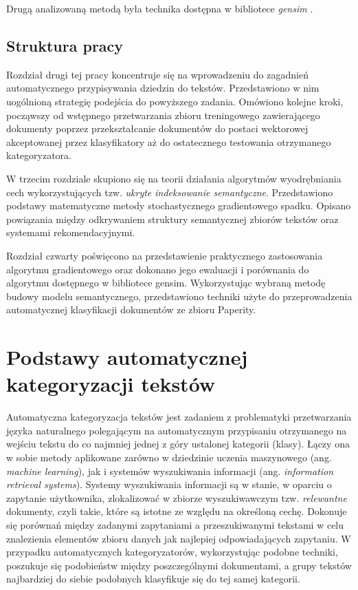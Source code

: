 \documentclass{pracamgr}
\begin{document}
Drugą analizowaną metodą była technika dostępna w bibliotece \textit{gensim} \cite{gensim}.

\section{Struktura pracy}

Rozdział drugi tej pracy koncentruje się na wprowadzeniu do zagadnień automatycznego przypisywania dziedzin do tekstów. Przedstawiono w nim uogólnioną strategię podejścia do powyższego zadania. Omówiono kolejne kroki, począwszy od wstępnego przetwarzania zbioru treningowego zawierającego dokumenty poprzez przekształcanie dokumentów do postaci wektorowej akceptowanej przez klasyfikatory aż do ostatecznego testowania otrzymanego kategoryzatora.

W trzecim rozdziale skupiono się na teorii działania algorytmów wyodrębniania cech wykorzystujących tzw. \textit{ukryte indeksowanie semantyczne}. Przedstawiono podstawy matematyczne metody stochastycznego gradientowego spadku. Opisano powiązania między odkrywaniem struktury semantycznej zbiorów tekstów oraz systemami rekomendacyjnymi.

Rozdział czwarty poświęcono na przedstawienie praktycznego zastosowania algorytmu gradientowego oraz dokonano jego ewaluacji i porównania do algorytmu dostępnego w bibliotece gensim. Wykorzystując wybraną metodę budowy modelu semantycznego, przedstawiono techniki użyte do przeprowadzenia automatycznej klasyfikacji dokumentów ze zbioru Paperity.

\chapter{Podstawy automatycznej kategoryzacji tekstów}

Automatyczna kategoryzacja tekstów jest zadaniem z problematyki przetwarzania języka naturalnego polegającym na automatycznym przypisaniu otrzymanego na wejściu tekstu do co najmniej jednej z góry ustalonej kategorii (klasy). Łączy ona w sobie metody aplikowane zarówno w dziedzinie uczenia maszynowego (ang. \textit{machine learning}), jak i systemów wyszukiwania informacji (ang. \textit{information retrieval systems}). Systemy wyszukiwania informacji są w stanie, w oparciu o zapytanie użytkownika, zlokalizować w zbiorze wyszukiwawczym tzw. \textit{relewantne} dokumenty, czyli takie, które są istotne ze względu na określoną cechę. Dokonuje się porównań między zadanymi zapytaniami a przeszukiwanymi tekstami w celu znalezienia elementów zbioru danych jak najlepiej odpowiadających zapytaniu. W przypadku automatycznych kategoryzatorów, wykorzystując podobne techniki, poszukuje się podobieństw między poszczególnymi dokumentami, a grupy tekstów najbardziej do siebie podobnych klasyfikuje się do tej samej kategorii.
\end{document}
